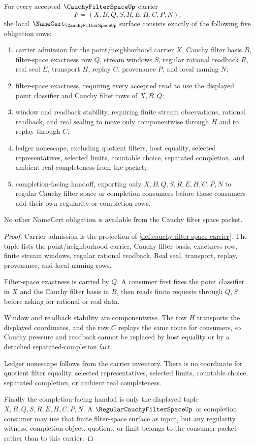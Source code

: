 \begin{theorem}
\label{thm:cauchy-filter-space-namecert-obligations}
For every accepted $\CauchyFilterSpaceUp$ carrier
$$
F=(X,B,Q,S,R,E,H,C,P,N),
$$
the local $\NameCert_{\CauchyFilterSpaceUp}$ surface consists exactly of the following five obligation rows:
\begin{enumerate}
\item carrier admission for the point/neighborhood carrier $X$, Cauchy filter basis $B$, filter-space exactness row $Q$, stream windows $S$, regular rational readback $R$, real seal $E$, transport $H$, replay $C$, provenance $P$, and local naming $N$;
\item filter-space exactness, requiring every accepted read to use the displayed point classifier and Cauchy filter rows of $X,B,Q$;
\item window and readback stability, requiring finite stream observations, rational readback, and real sealing to move only componentwise through $H$ and to replay through $C$;
\item ledger nonescape, excluding quotient filters, host equality, selected representatives, selected limits, countable choice, separated completion, and ambient real completeness from the packet;
\item completion-facing handoff, exporting only $X,B,Q,S,R,E,H,C,P,N$ to regular Cauchy filter space or completion consumers before those consumers add their own regularity or completion rows.
\end{enumerate}
No other NameCert obligation is available from the Cauchy filter space packet.
\end{theorem}
\begin{proof}
Carrier admission is the projection of \autoref{def:cauchy-filter-space-carrier}. The tuple lists the point/neighborhood carrier, Cauchy filter basis, exactness row, finite stream windows, regular rational readback, Real seal, transport, replay, provenance, and local naming rows.

Filter-space exactness is carried by $Q$. A consumer first fixes the point classifier in $X$ and the Cauchy filter basis in $B$, then reads finite requests through $Q,S$ before asking for rational or real data.

Window and readback stability are componentwise. The row $H$ transports the displayed coordinates, and the row $C$ replays the same route for consumers, so Cauchy pressure and readback cannot be replaced by host equality or by a detached separated-completion fact.

Ledger nonescape follows from the carrier inventory. There is no coordinate for quotient filter equality, selected representatives, selected limits, countable choice, separated completion, or ambient real completeness.

Finally the completion-facing handoff is only the displayed tuple $X,B,Q,S,R,E,H,C,P,N$. A $\RegularCauchyFilterSpaceUp$ or completion consumer may use that finite filter-space surface as input, but any regularity witness, completion object, quotient, or limit belongs to the consumer packet rather than to this carrier.
\end{proof}

